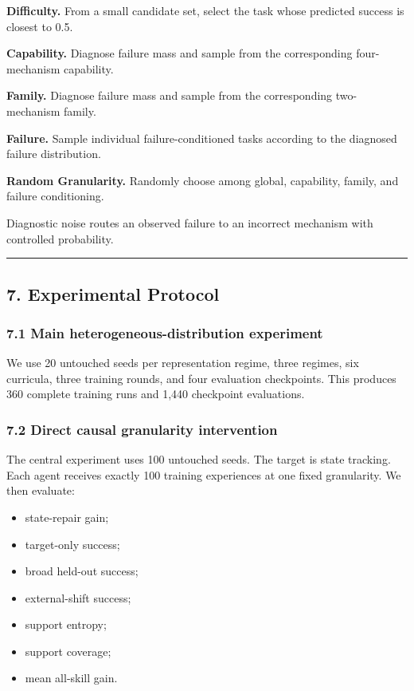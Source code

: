 \documentclass[
]{article}
\providecommand{\tightlist}{%
  \setlength{\itemsep}{0pt}\setlength{\parskip}{0pt}}
\begin{document}
\textbf{Difficulty.} From a small candidate set, select the task whose
predicted success is closest to 0.5.

\textbf{Capability.} Diagnose failure mass and sample from the
corresponding four-mechanism capability.

\textbf{Family.} Diagnose failure mass and sample from the corresponding
two-mechanism family.

\textbf{Failure.} Sample individual failure-conditioned tasks according
to the diagnosed failure distribution.

\textbf{Random Granularity.} Randomly choose among global, capability,
family, and failure conditioning.

Diagnostic noise routes an observed failure to an incorrect mechanism
with controlled probability.

\begin{center}\rule{0.5\linewidth}{0.5pt}\end{center}

\subsection{7. Experimental Protocol}\label{experimental-protocol}

\subsubsection{7.1 Main heterogeneous-distribution
experiment}\label{main-heterogeneous-distribution-experiment}

We use 20 untouched seeds per representation regime, three regimes, six
curricula, three training rounds, and four evaluation checkpoints. This
produces 360 complete training runs and 1,440 checkpoint evaluations.

\subsubsection{7.2 Direct causal granularity
intervention}\label{direct-causal-granularity-intervention}

The central experiment uses 100 untouched seeds. The target is state
tracking. Each agent receives exactly 100 training experiences at one
fixed granularity. We then evaluate:

\begin{itemize}
\tightlist
\item
  state-repair gain;
\item
  target-only success;
\item
  broad held-out success;
\item
  external-shift success;
\item
  support entropy;
\item
  support coverage;
\item
  mean all-skill gain.
\end{itemize}
\end{document}
